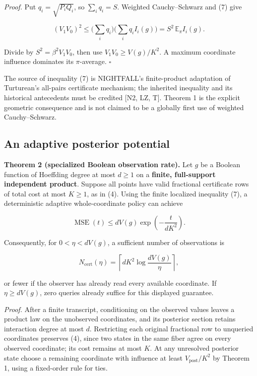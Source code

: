 \documentclass[
  10pt,
]{article}
\begin{document}
\emph{Proof.} Put \(q_i=\sqrt{P_iQ_i}\), so \(\sum_iq_i=S\). Weighted
Cauchy--Schwarz and (7) give

\[
(V_1V_0)^2\le\Big(\sum_iq_i\Big)\Big(\sum_iq_i I_i(g)\Big)
=S^2\,\mathbb E_{\pi}I_i(g).
\]

Divide by \(S^2=\beta^2V_1V_0\), then use \(V_1V_0\ge V(g)/K^2\). A
maximum coordinate influence dominates its \(\pi\)-average. \(\square\)

The source of inequality (7) is NIGHTFALL's finite-product adaptation of
Turturean's all-pairs certificate mechanism; the inherited inequality
and its historical antecedents must be credited {[}N2, LZ, T{]}. Theorem
1 is the explicit geometric consequence and is not claimed to be a
globally first use of weighted Cauchy--Schwarz.

\subsection{An adaptive posterior
potential}\label{an-adaptive-posterior-potential}

\textbf{Theorem 2 (specialized Boolean observation rate).} Let \(g\) be
a Boolean function of Hoeffding degree at most \(d\ge1\) on a
\textbf{finite, full-support independent product}. Suppose all points
have valid fractional certificate rows of total cost at most \(K\ge1\),
as in (4). Using the finite localized inequality (7), a deterministic
adaptive whole-coordinate policy can achieve

\[
\boxed{\operatorname{MSE}(t)\le dV(g)\exp\!\left(-\frac{t}{dK^2}\right).} \tag{9}
\]

Consequently, for \(0<\eta<dV(g)\), a sufficient number of observations
is

\[
\boxed{N_{\mathrm{cert}}(\eta)=\left\lceil dK^2\log\frac{dV(g)}{\eta}\right\rceil,} \tag{10}
\]

or fewer if the observer has already read every available coordinate. If
\(\eta\ge dV(g)\), zero queries already suffice for this displayed
guarantee.

\emph{Proof.} After a finite transcript, conditioning on the observed
values leaves a product law on the unobserved coordinates, and its
posterior section retains interaction degree at most \(d\). Restricting
each original fractional row to unqueried coordinates preserves (4),
since two states in the same fiber agree on every observed coordinate;
its cost remains at most \(K\). At any unresolved posterior state choose
a remaining coordinate with influence at least \(V_{\mathrm{post}}/K^2\)
by Theorem 1, using a fixed-order rule for ties.
\end{document}
